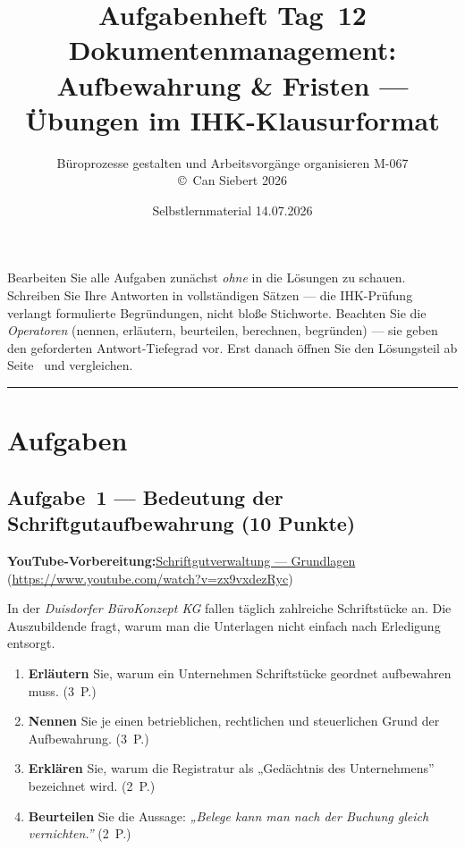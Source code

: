 \documentclass[11pt, a4paper]{article}
\title{\vspace*{-1.5cm}\Huge\bfseries\color{bfwPrimaryDark}Aufgabenheft Tag~12\\[0.4em]
  \large\color{bfwInkSoft}\textnormal{Dokumentenmanagement: Aufbewahrung \& Fristen --- Übungen im IHK-Klausurformat}}
\author{\textsf{Büroprozesse gestalten und Arbeitsvorgänge organisieren \textperiodcentered{} M-067}\\
\textsf{\small\copyright\ Can Siebert\,\textperiodcentered\,2026}}
\date{Selbstlernmaterial \textperiodcentered{} 14.07.2026}
\begin{document}
\maketitle
\thispagestyle{empty}

\begin{merksatz}[title={\bfseries So nutzen Sie dieses Aufgabenheft}]
Bearbeiten Sie alle Aufgaben zunächst \emph{ohne} in die Lösungen zu schauen. Schreiben
Sie Ihre Antworten in vollständigen Sätzen --- die IHK-Prüfung verlangt formulierte
Begründungen, nicht bloße Stichworte. Beachten Sie die \emph{Operatoren} (nennen,
erläutern, beurteilen, berechnen, begründen) --- sie geben den geforderten
Antwort-Tiefegrad vor. Erst danach öffnen Sie den Lösungsteil ab Seite~\pageref{loesungen}
und vergleichen.
\end{merksatz}

\tableofcontents
\vspace{1em}
\hrule

\section{Aufgaben}

\subsection*{Aufgabe~1 --- Bedeutung der Schriftgutaufbewahrung (10 Punkte)}

\noindent\textbf{\color{bfwAccent}YouTube-Vorbereitung:}\enspace \href{https://www.youtube.com/watch?v=zx9vxdezRyc}{Schriftgutverwaltung --- Grundlagen} (\url{https://www.youtube.com/watch?v=zx9vxdezRyc})

\medskip
In der \emph{Duisdorfer BüroKonzept KG} fallen täglich zahlreiche Schriftstücke an. Die
Auszubildende fragt, warum man die Unterlagen nicht einfach nach Erledigung entsorgt.

\begin{enumerate}[label=(\alph*)]
  \item \textbf{Erläutern} Sie, warum ein Unternehmen Schriftstücke geordnet aufbewahren muss. \hfill (3~P.)
  \item \textbf{Nennen} Sie je einen betrieblichen, rechtlichen und steuerlichen Grund der Aufbewahrung. \hfill (3~P.)
  \item \textbf{Erklären} Sie, warum die Registratur als „Gedächtnis des Unternehmens” bezeichnet wird. \hfill (2~P.)
  \item \textbf{Beurteilen} Sie die Aussage: \emph{„Belege kann man nach der Buchung gleich vernichten.”} \hfill (2~P.)
\end{enumerate}
\end{document}
